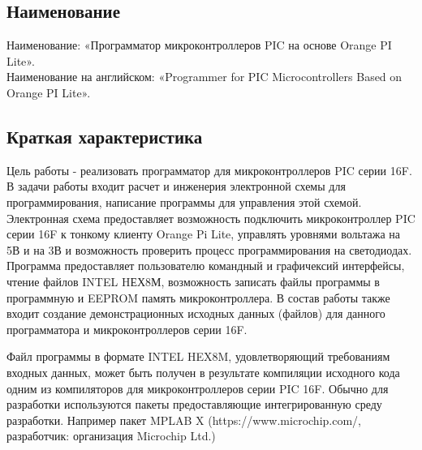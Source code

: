 \subsection{Наименование}
Наименование: «Программатор микроконтроллеров PIC на основе Orange PI Lite». \\
Наименование на английском: «Programmer for PIC Microcontrollers Based on Orange PI Lite». \\


\subsection{Краткая характеристика}
    Цель работы - реализовать программатор для микроконтроллеров PIC серии 16F.
    В задачи работы входит расчет и инженерия электронной схемы для программирования, написание программы для управления этой схемой.
    Электронная схема предоставляет возможность подключить микроконтроллер PIC серии 16F к тонкому клиенту Orange Pi Lite, управлять уровнями вольтажа на 5В и на 3В и возможность проверить процесс программирования на светодиодах.         
    Программа предоставляет пользователю командный и графичексий интерфейсы, чтение файлов INTEL HЕХ8М, возможность записать файлы программы в программную и EEPROM память микроконтроллера.
    В состав работы также входит создание демонстрационных исходных данных (файлов) для данного программатора и микроконтроллеров серии 16F.

\smallskip
Файл программы в формате INTEL HEX8M, удовлетворяющий требованиям входных данных, может быть получен в результате компиляции исходного кода одним из компиляторов для микроконтроллеров серии PIC 16F. Обычно для разработки используются пакеты предоставляющие интегрированную среду разработки. Например пакет MPLAB X (https://www.microchip.com/, разработчик: организация Microchip Ltd.)
